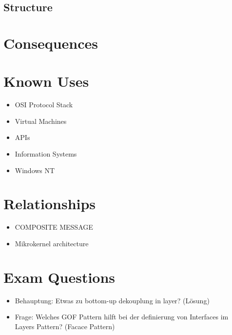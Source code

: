 \subsection{Structure}

%  

\section{Consequences}
\begin{itemize}
\end{itemize}

\section{Known Uses}
\begin{itemize}
	\item OSI Protocol Stack 
	\item Virtual Machines
	\item APIs
	\item Information Systems
	\item Windows NT
\end{itemize}

\section{Relationships}
\begin{itemize}
	\item COMPOSITE MESSAGE
	\item Mikrokernel architecture
\end{itemize}

\section{Exam Questions}
\begin{itemize}
  \item Behauptung: Etwas zu bottom-up dekouplung in layer? (Lösung)
    \item Frage: Welches GOF Pattern hilft bei der definierung von Interfaces im Layers Pattern? (Facace Pattern)
\end{itemize}
